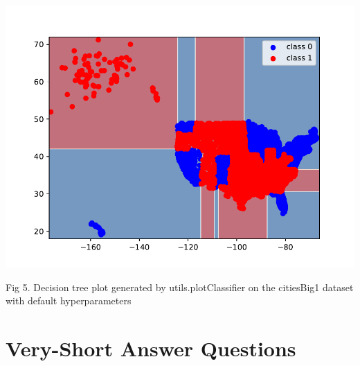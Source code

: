 \documentclass{article}
\begin{document}
{\includegraphics[scale=0.8]{../figs/q4_2_decision_plot_classifier}
\\ \centerline{Fig 5. Decision tree plot generated by utils.plotClassifier on the citiesBig1 dataset with default hyperparameters}
}

\section{Very-Short Answer Questions}
\end{document}
